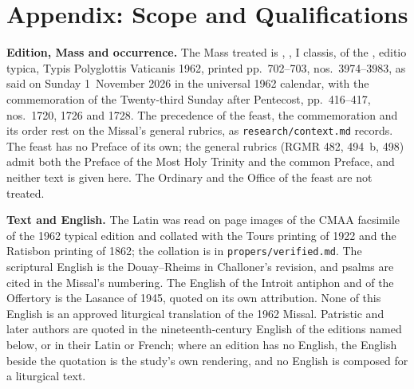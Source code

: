 
\section{Appendix: Scope and Qualifications}

{\footnotesize
\textbf{Edition, Mass and occurrence.} The Mass treated is , , I classis, of the , editio typica, Typis Polyglottis Vaticanis 1962, printed
pp.~702--703, nos.~3974--3983, as said on Sunday 1~November 2026 in the
universal 1962 calendar, with the commemoration of the Twenty-third Sunday
after Pentecost, pp.~416--417, nos.~1720, 1726 and 1728. The precedence of
the feast, the commemoration and its order rest on the Missal's general
rubrics, as \texttt{research/context.md} records. The feast has no Preface of
its own; the general rubrics (RGMR 482, 494~b, 498) admit both the Preface of
the Most Holy Trinity and the common Preface, and neither text is given here.
The Ordinary and the Office of the feast are not treated.

\textbf{Text and English.} The Latin was read on page images of the CMAA
facsimile of the 1962 typical edition and collated with the Tours printing of
1922 and the Ratisbon printing of 1862; the collation is in
\texttt{propers/verified.md}. The scriptural English is the Douay--Rheims in
Challoner's revision, and psalms are cited in the Missal's numbering. The
English of the Introit antiphon and of the Offertory is the Lasance
 of 1945, quoted on its own attribution. None of this
English is an approved liturgical translation of the 1962 Missal. Patristic
and later authors are quoted in the nineteenth-century English of the
editions named below, or in their Latin or French; where an edition has no
English, the English beside the quotation is the study's own rendering, and
no English is composed for a liturgical text.

}
